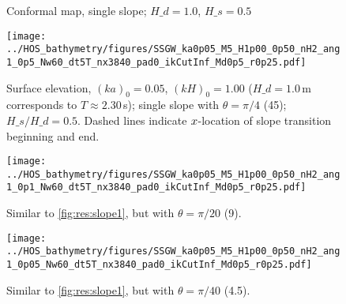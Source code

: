 \begin{figure}[H]%
\centering
{}%
%
%
\caption{Conformal map, single slope; $H\_d = 1.0$, $H\_s = 0.5$}%
\label{fig:res:map_slope}%
\end{figure}

\begin{figure}[H]%
\centering
\texttt{[image: ../HOS\_bathymetry/figures/SSGW\_ka0p05\_M5\_H1p00\_0p50\_nH2\_ang1\_0p5\_Nw60\_dt5T\_nx3840\_pad0\_ikCutInf\_Md0p5\_r0p25.pdf]}%
\caption{Surface elevation, $(ka)_0 = 0.05$, $(kH)_0 = 1.00$ ($H\_d=1.0$\,m corresponds to $T\approx2.30$\,s); single slope with $\theta=\pi/4$ (45\textdegree); $H\_s/H\_d = 0.5$. Dashed lines indicate $x$-location of slope transition beginning and end.}%
\label{fig:res:slope1}%
\end{figure}
\begin{figure}[H]%
\centering 
\texttt{[image: ../HOS\_bathymetry/figures/SSGW\_ka0p05\_M5\_H1p00\_0p50\_nH2\_ang1\_0p1\_Nw60\_dt5T\_nx3840\_pad0\_ikCutInf\_Md0p5\_r0p25.pdf]}%
\caption{Similar to \autoref{fig:res:slope1}, but with $\theta=\pi/20$  (9\textdegree).}%
\label{fig:res:slope2}%
\end{figure}
\begin{figure}[H]%
\centering 															  
\texttt{[image: ../HOS\_bathymetry/figures/SSGW\_ka0p05\_M5\_H1p00\_0p50\_nH2\_ang1\_0p05\_Nw60\_dt5T\_nx3840\_pad0\_ikCutInf\_Md0p5\_r0p25.pdf]}%
\caption{Similar to \autoref{fig:res:slope1}, but with $\theta=\pi/40$ (4.5\textdegree).}%
\label{fig:res:slope3}%
\end{figure}








%